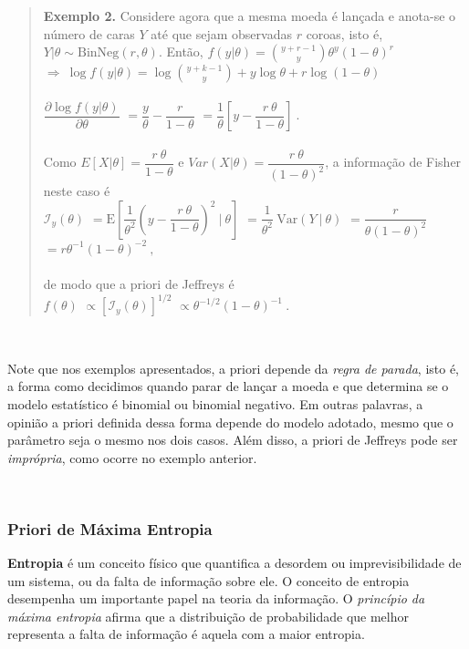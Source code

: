 \documentclass[
]{book}
\begin{document}
\begin{quote}
\textbf{Exemplo 2.} Considere agora que a mesma moeda é lançada e anota-se o número de caras \(Y\) até que sejam observadas \(r\) coroas, isto é, \(Y|\theta \sim \text{BinNeg}(r,\theta)\). Então,
\(f(y|\theta)=\displaystyle\binom{y+r-1}{y}\theta^y(1-\theta)^{r}\)
\(\Longrightarrow~ \log f(y|\theta)=\log\binom{y+k-1}{y}+y\log\theta+r\log(1-\theta)\)\\
\(~\)\\
\(\dfrac{\partial\log f(y|\theta)}{\partial\theta}\)
\(=\dfrac{y}{\theta}-\dfrac{r}{1-\theta}\)
\(=\dfrac{1}{\theta}\left[y-\dfrac{r~\theta}{1-\theta}\right]~.\)\\
\(~\)\\
Como \(E\left[X|\theta\right]=\dfrac{r~\theta}{1-\theta}\) e \(Var(X|\theta)=\dfrac{r~\theta}{(1-\theta)^2}\), a informação de Fisher neste caso é\\
\(\mathcal{I}_y(\theta)\) \(=\text{E}\left[\dfrac{1}{\theta^2}\left(y-\dfrac{r~\theta}{1-\theta}\right)^2~\bigg|~\theta\right]\)
\(=\dfrac{1}{\theta^2}~\text{Var}\left(Y~|~\theta\right)\)
\(=\dfrac{r}{\theta(1-\theta)^2}\) \(=r\theta^{-1}(1-\theta)^{-2}~,\)\\
\(~\)\\
de modo que a priori de Jeffreys é\\
\(f(\theta)\) \(\propto\left[\mathcal{I}_y(\theta)\right]^{1/2}\)
\(\propto\theta^{-1/2}(1-\theta)^{-1}~.\)
\end{quote}

\(~\)

Note que nos exemplos apresentados, a priori depende da \emph{regra de parada}, isto é, a forma como decidimos quando parar de lançar a moeda e que determina se o modelo estatístico é binomial ou binomial negativo. Em outras palavras, a opinião a priori definida dessa forma depende do modelo adotado, mesmo que o parâmetro seja o mesmo nos dois casos. Além disso, a priori de Jeffreys pode ser \emph{imprópria}, como ocorre no exemplo anterior.

\(~\)

\hypertarget{priori-de-muxe1xima-entropia}{%
\subsubsection{Priori de Máxima Entropia}\label{priori-de-muxe1xima-entropia}}

\textbf{Entropia} é um conceito físico que quantifica a desordem ou imprevisibilidade de um sistema, ou da falta de informação sobre ele. O conceito de entropia desempenha um importante papel na teoria da informação. O \emph{princípio da máxima entropia} afirma que a distribuição de probabilidade que melhor representa a falta de informação é aquela com a maior entropia.
\end{document}
